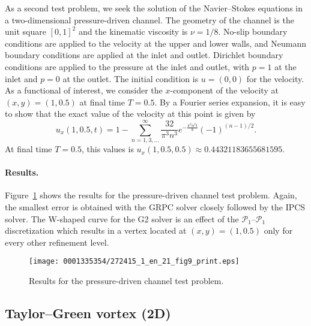 As a second test problem, we seek the solution of the Navier--Stokes
equations in a two-dimensional pressure-driven channel. The geometry
of the channel is the unit square $[0, 1]^2$ and the kinematic
viscosity is $\nu = 1/8$. No-slip boundary conditions are applied to
the velocity at the upper and lower walls, and Neumann boundary
conditions are applied at the inlet and outlet. Dirichlet boundary
conditions are applied to the pressure at the inlet and outlet, with
$p = 1$ at the inlet and $p = 0$ at the outlet. The initial condition
is $u = (0, 0)$ for the velocity. As a functional of interest, we
consider the $x$-component of the velocity at $(x, y) = (1, 0.5)$ at
final time $T = 0.5$. By a Fourier series expansion, it is easy to
show that the exact value of the velocity at this point is given by
\begin{equation} \label{eq:exact_channel}
  u_x(1, 0.5, t) = 1 - \sum_{n=1,3,...}^\infty \frac{32}{\pi^3 n^3}
  e^{-\frac{\pi^2 n^2 t}{8}} (-1)^{(n-1)/2}.
\end{equation}
At final time $T=0.5$, this values is $u_x(1, 0.5, 0.5) \approx
0.44321183655681595$.

\paragraph{Results.}

Figure~\ref{fig:channel_results} shows the results for the
pressure-driven channel test problem. Again, the smallest error is
obtained with the GRPC solver closely followed by the IPCS solver.
The W-shaped curve for the G2 solver is an effect of the $\mathcal{P}_1$--$\mathcal{P}_1$
discretization which results in a vertex located at $(x, y) = (1,
0.5)$ only for every other refinement level.

\begin{figure}[!t]
\centering
\texttt{[image: 0001335354/272415\_1\_en\_21\_fig9\_print.eps]}
  \caption{Results for the pressure-driven channel test problem.}
           \label{fig:channel_results}%
\end{figure}

\subsection{Taylor--Green vortex (2D)}

